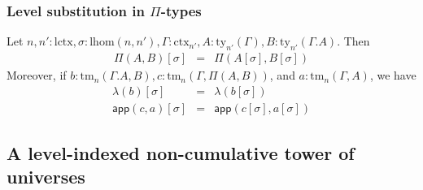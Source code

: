 \documentclass[11pt,a4paper]{article}
\theoremstyle{definition}
\newcommand{\app}[2]{{#1\,#2}} %
\def\lhom{\mathrm{lhom}}
\def\lctx{\mathrm{lctx}}
\newcommand{\ctx}{\mathrm{ctx}}
\newcommand{\ty}{\mathrm{ty}}
\newcommand{\tm}{\mathrm{tm}}
\def\app{\mathsf{app}}
\begin{document}


\subsubsection{Level substitution in $\Pi$-types}

Let $n, n' : \lctx , \sigma : \lhom(n,n'), \Gamma : \ctx_{n'}, A:\ty_{n'}(\Gamma), B:\ty_{n'}(\Gamma.A)$. Then
\begin{eqnarray*}
\Pi(A,B)[\sigma] &=& \Pi(A[\sigma],B[\sigma])
\end{eqnarray*}
Moreover, if $b : \tm_n(\Gamma.A,B), c :  \tm_n(\Gamma,\Pi(A,B))$,  and $a : \tm_n(\Gamma,A)$, we have
\begin{eqnarray*}
\lambda(b)[\sigma] &=&\lambda(b[\sigma])\\
\app(c,a)[\sigma] &=&\app(c[\sigma],a[\sigma])
\end{eqnarray*}

\subsection{A level-indexed non-cumulative tower of universes}
\end{document}
